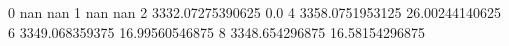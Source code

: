 0 nan nan
1 nan nan
2 3332.07275390625 0.0
4 3358.0751953125 26.00244140625
6 3349.068359375 16.99560546875
8 3348.654296875 16.58154296875
